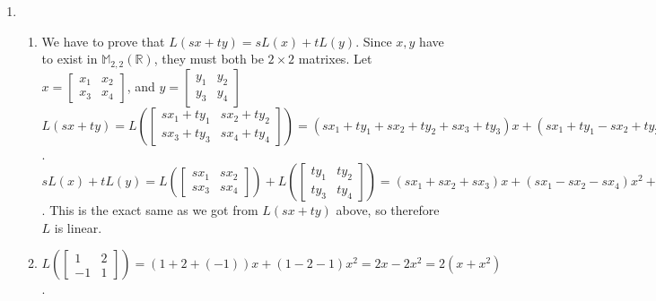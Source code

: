 \documentclass[10pt,english]{article}
\begin{document}
\begin{enumerate}
\begin{enumerate}
Row reducing $A^T$ we get $\begin{bmatrix}1&0&2\\0&1&-1\\0&0&0\\0&0&0\end{bmatrix}$. From this we can see a basis for the nullspace of $A^T$, and hence a basis for the left nullspace of $A$ is $\left\{\begin{bmatrix}-2\\1\\1\end{bmatrix}\right\}$.
\end{enumerate}\pagebreak

\item \begin{enumerate}
    \item We have to prove that $L(sx+ty)=sL(x)+tL(y)$. Since $x,y$ have to exist in $\mathbb{M}_{2,2}(\mathbb{R})$, they must both be $2\times2$ matrixes. Let $x=\begin{bmatrix}x_1&x_2\\x_3&x_4\end{bmatrix}$, and $y=\begin{bmatrix}y_1&y_2\\y_3&y_4\end{bmatrix}$ $L(sx+ty)=L(\begin{bmatrix}sx_1+ty_1&sx_2+ty_2\\sx_3+ty_3&sx_4+ty_4\end{bmatrix})=(sx_1+ty_1+sx_2+ty_2+sx_3+ty_3)x+(sx_1+ty_1-sx_2+ty_2-sx_4+ty_4)x^2$. $sL(x)+tL(y)=L\left(\begin{bmatrix}sx_1&sx_2\\sx_3&sx_4\end{bmatrix}\right)+L\left(\begin{bmatrix}ty_1&ty_2\\ty_3&ty_4\end{bmatrix}\right)=(sx_1+sx_2+sx_3)x+(sx_1-sx_2-sx_4)x^2+(ty_1+ty_2+ty_3)x+(ty_1-ty_2-ty_4)x^2=(sx_1+ty_1+sx_2+ty_2+sx_3+ty_3)x+(sx_1+ty_1-sx_2+ty_2-sx_4+ty_4)x^2$. This is the exact same as we got from $L(sx+ty)$ above, so therefore $L$ is linear. 
    
    \item $L\left(\begin{bmatrix}1&2\\-1&1\end{bmatrix}\right)=(1+2+(-1))x+(1-2-1)x^2=2x-2x^2=2(x+x^2)$.
    

\end{enumerate}
\end{enumerate}
\end{document}
